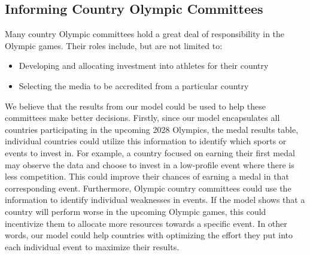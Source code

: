 \documentclass{mcmthesis}
\begin{document}
\subsection{Informing Country Olympic Committees}
Many country Olympic committees hold a great deal of responsibility in the Olympic games. Their roles include, but are not limited to:
\begin{itemize}
    \item Developing and allocating investment into athletes for their country
    \item Selecting the media to be accredited from a particular country
\end{itemize} \par
We believe that the results from our model could be used to help these committees make better decisions. Firstly, since our model encapsulates all countries participating in the upcoming 2028 Olympics, the medal results table, individual countries could utilize this information to identify which sports or events to invest in. For example, a country focused on earning their first medal may observe the data and choose to invest in a low-profile event where there is less competition. This could improve their chances of earning a medal in that corresponding event. Furthermore, Olympic country committees could use the information to identify individual weaknesses in events. If the model shows that a country will perform worse in the upcoming Olympic games, this could incentivize them to allocate more resources towards a specific event. In other words, our model could help countries with optimizing the effort they put into each individual event to maximize their results.  
\end{document}
